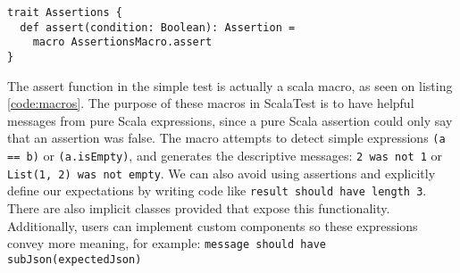 \begin{lstlisting}[caption=Macros, label=code:macros, float]
trait Assertions {
  def assert(condition: Boolean): Assertion =
    macro AssertionsMacro.assert
}
\end{lstlisting}

The assert function in the simple test is actually a scala macro, as seen on listing \ref{code:macros}. The purpose of these macros in ScalaTest is to have helpful messages from pure Scala expressions, since a pure Scala assertion could only say that an assertion was false. The macro attempts to detect simple expressions \texttt{(a == b)} or \texttt{(a.isEmpty)}, and generates the descriptive messages: \texttt{2 was not 1} or \texttt{List(1, 2) was not empty}. We can also avoid using assertions and explicitly define our expectations by writing code like \texttt{result should have length 3}. There are also implicit classes provided that expose this functionality. Additionally, users can implement custom components so these expressions convey more meaning, for example: \texttt{message should have subJson(expectedJson)}
